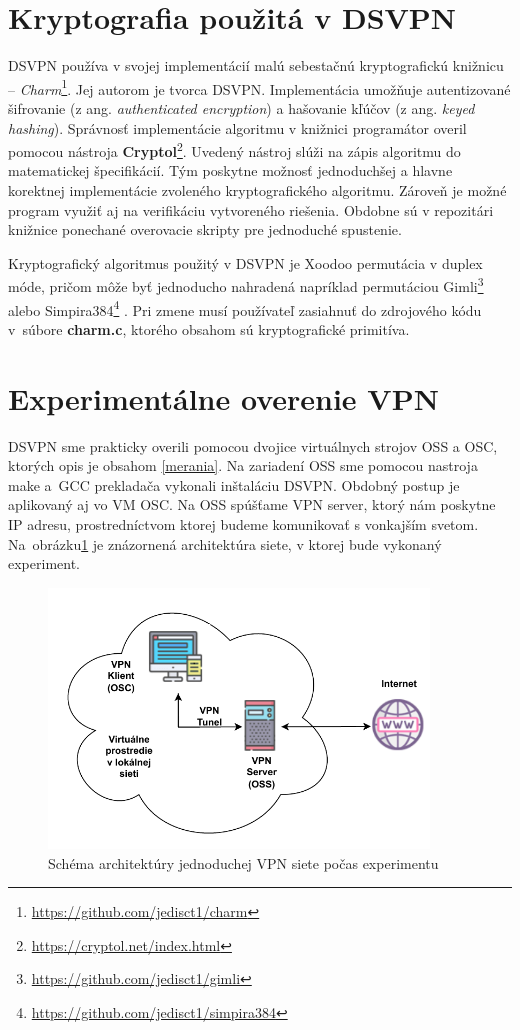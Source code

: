\section{Kryptografia použitá v DSVPN}
DSVPN používa v svojej implementácií malú sebestačnú kryptografickú knižnicu -- \textit{Charm}\footnote{\url{https://github.com/jedisct1/charm}}. Jej autorom je tvorca DSVPN. Implementácia umožňuje autentizované šifrovanie (z ang. \textit{authenticated encryption}) a hašovanie kľúčov (z ang. \textit{keyed hashing}). Správnosť implementácie algoritmu v knižnici programátor overil pomocou nástroja \textbf{Cryptol}\footnote{\url{https://cryptol.net/index.html}}. Uvedený nástroj slúži na zápis algoritmu do matematickej špecifikácií. Tým poskytne možnosť jednoduchšej a hlavne korektnej implementácie zvoleného kryptografického algoritmu. Zároveň je možné program využiť aj na verifikáciu vytvoreného riešenia. Obdobne sú v repozitári knižnice ponechané overovacie skripty pre jednoduché spustenie. 

Kryptografický algoritmus použitý v DSVPN je Xoodoo permutácia v duplex móde, pričom môže byť jednoducho nahradená napríklad permutáciou Gimli\footnote{\url{https://github.com/jedisct1/gimli}} \cite{gimli} alebo Simpira384\footnote{\url{https://github.com/jedisct1/simpira384}} \cite{simpira}. Pri zmene musí používateľ zasiahnuť do zdrojového kódu v~súbore \textbf{charm.c}, ktorého obsahom sú kryptografické primitíva.     
\section{Experimentálne overenie VPN}
DSVPN sme prakticky overili pomocou dvojice virtuálnych strojov OSS a OSC, ktorých opis je obsahom \ref{merania}. Na zariadení OSS sme pomocou nastroja make a~GCC prekladača vykonali inštaláciu DSVPN. Obdobný postup je aplikovaný aj vo VM OSC. Na OSS spúšťame VPN server, ktorý nám poskytne IP adresu, prostredníctvom ktorej budeme komunikovať s vonkajším svetom. Na~obrázku\ref{vpnsimple} je znázornená architektúra siete, v ktorej bude vykonaný experiment.

\begin{figure}
	\centering
	\includegraphics[width=0.9\textwidth]{figures/vpnsimple}
	\caption{Schéma architektúry jednoduchej VPN siete počas experimentu}
	\label{vpnsimple}
\end{figure}

